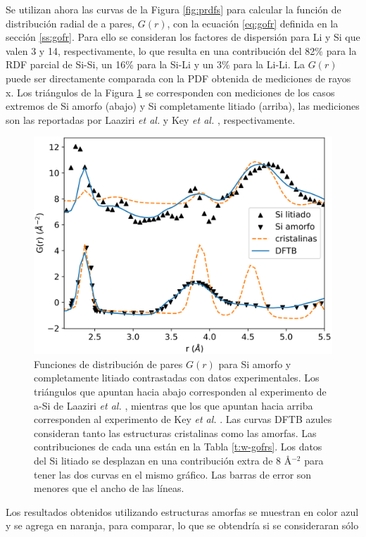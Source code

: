 Se utilizan ahora las curvas de la Figura \ref{fig:prdfs} para calcular la función
de distribución radial de a pares, $G(r)$, con la ecuación \ref{eq:gofr} definida 
en la sección \ref{ss:gofr}. Para ello se consideran los factores de 
dispersión para Li y Si que valen 3 y 14, respectivamente, lo que resulta en una 
contribución del 82\% para la RDF parcial de Si-Si, un 16\% para la Si-Li y
un 3\% para la Li-Li. La $G(r)$ puede ser directamente comparada con la PDF
obtenida de mediciones de rayos x. Los triángulos de la Figura \ref{fig:pdfs} 
se corresponden con mediciones de los casos extremos de Si amorfo (abajo) y
Si completamente litiado (arriba), las mediciones son las reportadas por Laaziri 
\textit{et al.} \cite{laaziri1999} y Key \textit{et al.} \cite{key2011}, respectivamente.
\begin{figure}[h!]
    \centering
    \includegraphics[width=.7\textwidth]{Silicio/prediccion/resultados/xray/pdfs.png}
    \caption{Funciones de distribución de pares $G(r)$ para Si amorfo y 
    completamente litiado contrastadas con datos experimentales. Los triángulos 
    que apuntan hacia abajo corresponden al experimento de a-Si de Laaziri 
    \textit{et al.} \cite{laaziri1999}, mientras que los que apuntan hacia arriba 
    corresponden al experimento de Key \textit{et al.} \cite{key2011}. Las curvas 
    DFTB azules consideran tanto las estructuras cristalinas como las amorfas. Las 
    contribuciones de cada una están en la Tabla  \ref{t:w-gofrs}. Los datos del Si 
    litiado se desplazan en una contribución extra de 8 \AA$^{-2}$ para tener las dos curvas 
    en el mismo gráfico. Las barras de error son menores que el ancho de las líneas.}
    \label{fig:pdfs}
\end{figure}
Los resultados obtenidos utilizando estructuras amorfas se muestran en color azul 
y se agrega en naranja, para comparar, lo que se obtendría si se consideraran sólo
